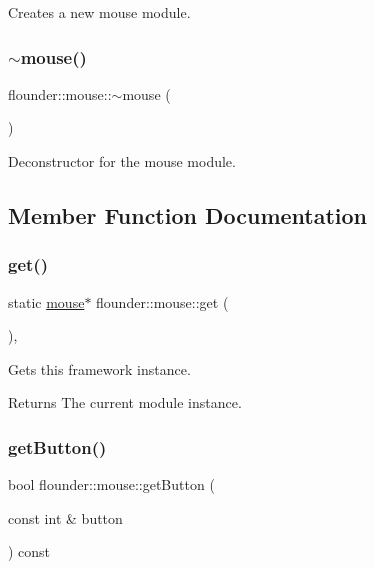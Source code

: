 Creates a new mouse module. 

\mbox{\label{classflounder_1_1mouse_a3038f39f358e37d15059af6c1675497b}} 
\subsubsection{\texorpdfstring{$\sim$mouse()}{~mouse()}}
{\footnotesize\ttfamily flounder\+::mouse\+::$\sim$mouse (\begin{DoxyParamCaption}{ }\end{DoxyParamCaption})}



Deconstructor for the mouse module. 



\subsection{Member Function Documentation}
\mbox{\label{classflounder_1_1mouse_ac164dd73c45f0babcb67c9e24f50eff2}} 
\subsubsection{\texorpdfstring{get()}{get()}}
{\footnotesize\ttfamily static \hyperlink{classflounder_1_1mouse}{mouse}$\ast$ flounder\+::mouse\+::get (\begin{DoxyParamCaption}{ }\end{DoxyParamCaption})\hspace{0.3cm}{\ttfamily [inline]}, {\ttfamily [static]}}



Gets this framework instance. 

\begin{DoxyReturn}{Returns}
The current module instance. 
\end{DoxyReturn}
\mbox{\label{classflounder_1_1mouse_a86322c7df5401b550b09fbc3ccf1a13e}} 
\subsubsection{\texorpdfstring{get\+Button()}{getButton()}}
{\footnotesize\ttfamily bool flounder\+::mouse\+::get\+Button (\begin{DoxyParamCaption}\item[{const int \&}]{button }\end{DoxyParamCaption}) const\hspace{0.3cm}{\ttfamily [inline]}}



